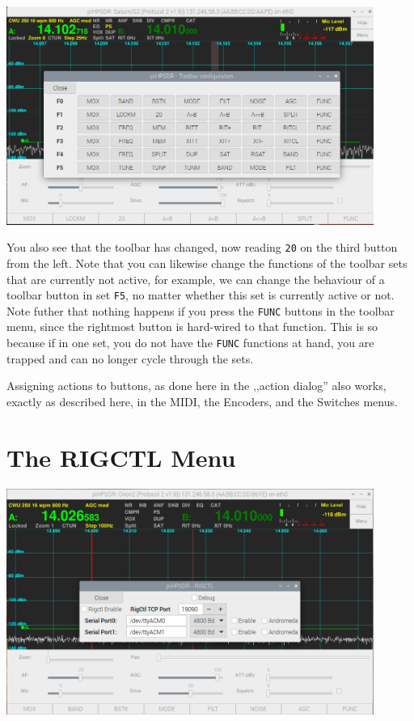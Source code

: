 \documentclass[12pt]{book}
\begin{document}
\begin{center}
\includegraphics[width=12cm]{ToolbarMenu4.png}
\end{center}
You also see that the toolbar has changed, now reading \texttt{20} on the third button from the left. Note that
you can likewise change the functions of the toolbar sets that are currently not active, for example, we can
change the behaviour of a toolbar button in set \texttt{F5}, no matter whether this set is currently active
or not. Note futher that nothing happens if you press the \texttt{FUNC} buttons in the toolbar menu, since the
rightmost button is hard-wired to that function. This is so because if in one set, you do not have the 
\texttt{FUNC} functions at hand, you are trapped and can no longer cycle through the sets.

Assigning actions to buttons, as done here in the ,,action dialog'' also works, exactly as described here,
in the MIDI, the Encoders, and the Switches menus.


\section{The RIGCTL Menu}
\begin{center}
\includegraphics[width=12cm]{RigCtlMenu.png}
\end{center}
\end{document}
